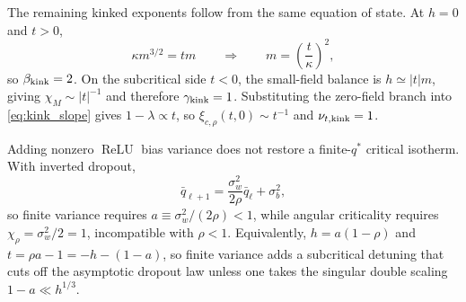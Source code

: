 \documentclass{article}
\DeclareMathOperator{\ReLU}{ReLU}
\newcommand{\relu}{\ensuremath{\ReLU}}
\theoremstyle{plain}
\theoremstyle{definition}
\theoremstyle{remark}
\begin{document}
The remaining kinked exponents follow from the same equation of state. At \(h=0\) and \(t>0\),
\relax
\begin{equation}
\kappa m^{3/2}=tm \qquad\Rightarrow\qquad m=\left(\frac{t}{\kappa}\right)^2,
\end{equation}
\relax
so \(\beta_{\rm kink}=2\). On the subcritical side \(t<0\), the small-field balance is \(h\simeq |t|m\), giving \(\chi_M\sim |t|^{-1}\) and therefore \(\gamma_{\rm kink}=1\). Substituting the zero-field branch into \eqref{eq:kink_slope} gives \(1-\lambda\propto t\), so \(\xi_{c,\rho}(t,0)\sim t^{-1}\) and \(\nu_{t,\rm kink}=1\).

Adding nonzero \relu{} bias variance does not restore a finite-\(q^*\) critical isotherm. With inverted dropout,
\relax
\begin{equation}
\bar q_{\ell+1}=\frac{\sigma_w^2}{2\rho}\bar q_\ell+\sigma_b^2,
\end{equation}
\relax
so finite variance requires \(a\equiv\sigma_w^2/(2\rho)<1\), while angular criticality requires \(\chi_\rho=\sigma_w^2/2=1\), incompatible with \(\rho<1\). Equivalently, \(h=a(1-\rho)\) and \(t=\rho a-1=-h-(1-a)\), so finite variance adds a subcritical detuning that cuts off the asymptotic dropout law unless one takes the singular double scaling \(1-a\ll h^{1/3}\).
\end{document}
